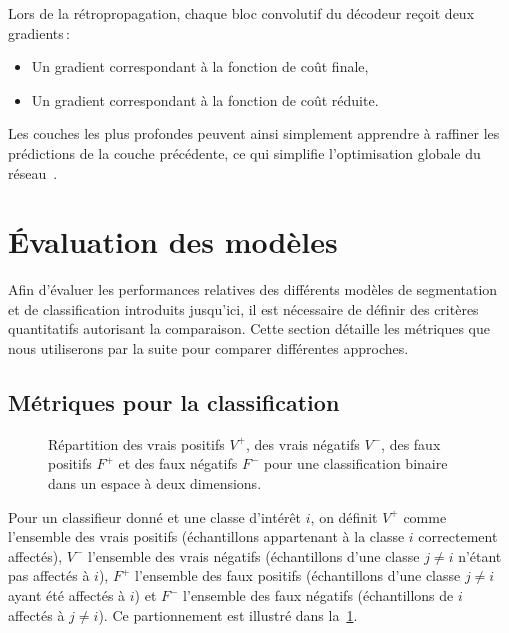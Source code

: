 Lors de la rétropropagation, chaque bloc convolutif du décodeur reçoit deux gradients\,:
\begin{itemize}
	\item Un gradient correspondant à la fonction de coût finale,
  \item Un gradient correspondant à la fonction de coût réduite.
\end{itemize}
Les couches les plus profondes peuvent ainsi simplement apprendre à raffiner les prédictions de la couche précédente, ce qui simplifie l'optimisation globale du réseau~\cite{lin_refinenet_2017}.

\section{Évaluation des modèles}
\label{sec:metriques}

Afin d'évaluer les performances relatives des différents modèles de segmentation et de classification introduits jusqu'ici, il est nécessaire de définir des critères quantitatifs autorisant la comparaison. Cette section détaille les métriques que nous utiliserons par la suite pour comparer différentes approches.

\subsection{Métriques pour la classification}

\def\tp{V^+}
\def\tn{V^-}
\def\fp{F^+}
\def\fn{F^-}
\def\precision{\mathit{pr\acute{e}cision}}
\def\recall{\mathit{rappel}}

\begin{figure}[ht]
	\resizebox{\textwidth}{!}{%
	
	}
	\caption[Métriques de classification binaire]{Répartition des vrais positifs $\tp$, des vrais négatifs $\tn$, des faux positifs $\fp$ et des faux négatifs $\fn$ pour une classification binaire dans un espace à deux dimensions.}
	\label{fig:classification_binaire}
\end{figure}

Pour un classifieur donné et une classe d'intérêt $i$, on définit $\tp$ comme l'ensemble des vrais positifs (échantillons appartenant à la classe $i$ correctement affectés), $\tn$ l'ensemble des vrais négatifs (échantillons d'une classe $j \neq i$ n'étant pas affectés à $i$), $\fp$ l'ensemble des faux positifs (échantillons d'une classe $j \neq i$ ayant été affectés à $i$) et $\fn$ l'ensemble des faux négatifs (échantillons de $i$ affectés à $j \neq i$). Ce partionnement est illustré dans la~\cref{fig:classification_binaire}.

